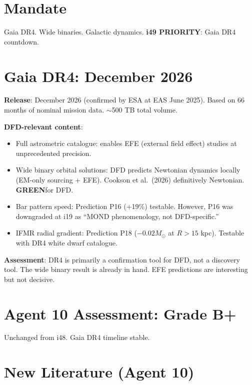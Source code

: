\documentclass[11pt,a4paper]{article}
\newcommand{\GREEN}{\textcolor{dfdgreen}{\textbf{GREEN}}}
\begin{document}
\section{Mandate}

Gaia DR4. Wide binaries. Galactic dynamics. \textbf{i49 PRIORITY}: Gaia DR4 countdown.

\section{Gaia DR4: December 2026}

\begin{tcolorbox}[colback=blue!5!white, colframe=blue!60!black,
  title={Gaia DR4: December 2026 --- DFD Implications}]

\textbf{Release}: December 2026 (confirmed by ESA at EAS June 2025). Based on 66 months of nominal mission data. $\sim$500 TB total volume.

\textbf{DFD-relevant content}:
\begin{itemize}
\item Full astrometric catalogue: enables EFE (external field effect) studies at unprecedented precision.
\item Wide binary orbital solutions: DFD predicts Newtonian dynamics locally (EM-only sourcing + EFE). Cookson et al.\ (2026) definitively Newtonian. \GREEN for DFD.
\item Bar pattern speed: Prediction P16 (+19\%) testable. However, P16 was downgraded at i19 as ``MOND phenomenology, not DFD-specific.''
\item IFMR radial gradient: Prediction P18 ($-0.02 M_\odot$ at $R > 15$ kpc). Testable with DR4 white dwarf catalogue.
\end{itemize}

\textbf{Assessment}: DR4 is primarily a confirmation tool for DFD, not a discovery tool. The wide binary result is already in hand. EFE predictions are interesting but not decisive.
\end{tcolorbox}

\section{Agent 10 Assessment: Grade B+}

Unchanged from i48. Gaia DR4 timeline stable.

\section{New Literature (Agent 10)}
\end{document}
